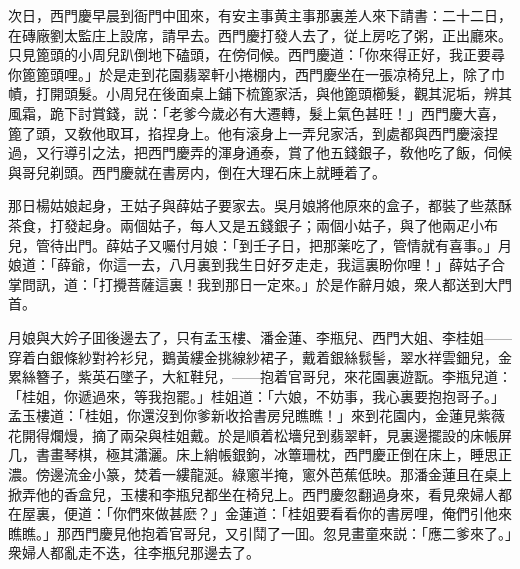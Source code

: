 次日，西門慶早晨到衙門中囬來，有安主事黄主事那裏差人來下請書：二十二日，在磚廠劉太監庄上設席，請早去。西門慶打發人去了，従上房吃了粥，正出廳來。只見篦頭的小周兒趴倒地下磕頭，在傍伺候。西門慶道：「你來得正好，我正要尋你篦篦頭哩。」於是走到花園翡翠軒小捲棚内，西門慶坐在一張凉椅兒上，除了巾幘，打開頭髮。小周兒在後面桌上鋪下梳篦家活，與他篦頭櫛髮，觀其泥垢，辨其風霜，跪下討賞錢，説：「老爹今歲必有大遷轉，髮上氣色甚旺！」西門慶大喜，篦了頭，又敎他取耳，掐捏身上。他有滚身上一弄兒家活，到處都與西門慶滚捏過，又行導引之法，把西門慶弄的渾身通泰，賞了他五錢銀子，敎他吃了飯，伺候與哥兒剃頭。西門慶就在書房内，倒在大理石床上就睡着了。

那日楊姑娘起身，王姑子與薛姑子要家去。吳月娘將他原來的盒子，都裝了些蒸酥茶食，打發起身。兩個姑子，每人又是五錢銀子；兩個小姑子，與了他兩疋小布兒，管待出門。薛姑子又囑付月娘：「到壬子日，把那薬吃了，管情就有喜事。」月娘道：「薛爺，你這一去，八月裏到我生日好歹走走，我這裏盼你哩！」薛姑子合掌問訊，道：「打攪菩薩這裏！我到那日一定來。」於是作辭月娘，衆人都送到大門首。

月娘與大妗子囬後邊去了，只有孟玉樓、潘金蓮、李瓶兒、西門大姐、李桂姐——穿着白銀條紗對衿衫兒，鵝黃縷金挑線紗裙子，戴着銀絲䯼髻，翠水祥雲鈿兒，金累絲簪子，紫英石墜子，大紅鞋兒，——抱着官哥兒，來花園裏遊翫。李瓶兒道：「桂姐，你遞過來，等我抱罷。」桂姐道：「六娘，不妨事，我心裏要抱抱哥子。」孟玉樓道：「桂姐，你還沒到你爹新收拾書房兒瞧瞧！」來到花園内，金蓮見紫薇花開得爛熳，摘了兩朶與桂姐戴。於是順着松墻兒到翡翠軒，見裏邊擺設的床帳屏几，書畫琴棋，極其瀟灑。床上綃帳銀鉤，冰簟珊枕，西門慶正倒在床上，睡思正濃。傍邊流金小篆，焚着一縷龍涎。綠窻半掩，窻外芭蕉低映。那潘金蓮且在桌上掀弄他的香盒兒，玉樓和李瓶兒都坐在椅兒上。西門慶忽翻過身來，看見衆婦人都在屋裏，便道：「你們來做甚麽？」金蓮道：「桂姐要看看你的書房哩，俺們引他來瞧瞧。」那西門慶見他抱着官哥兒，又引鬦了一囬。忽見畫童來説：「應二爹來了。」衆婦人都亂走不迭，往李瓶兒那邊去了。

